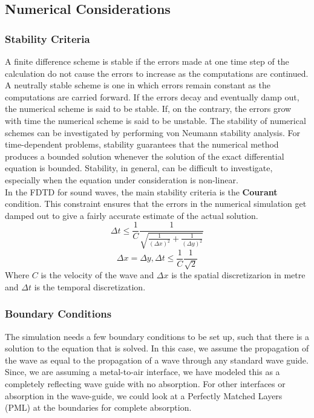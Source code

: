 \subsection{Numerical Considerations}
\subsubsection{Stability Criteria}
A finite difference scheme is stable if the errors made at one time step of the calculation do not cause the errors to increase as the computations are continued. A neutrally stable scheme is one in which errors remain constant as the computations are carried forward. If the errors decay and eventually damp out, the numerical scheme is said to be stable. If, on the contrary, the errors grow with time the numerical scheme is said to be unstable. The stability of numerical schemes can be investigated by performing von Neumann stability analysis. For time-dependent problems, stability guarantees that the numerical method produces a bounded solution whenever the solution of the exact differential equation is bounded. Stability, in general, can be difficult to investigate, especially when the equation under consideration is non-linear. \\
In the FDTD for sound waves, the main stability criteria is the \textbf{Courant} condition. This constraint ensures that the errors in the numerical simulation get damped out to give a fairly accurate  estimate of the actual solution.
\begin{equation}
\Delta t \leq \frac{1}{C} \frac{1}{\sqrt{\frac{1}{(\Delta x)^2}+\frac{1}{(\Delta y)^2}}}
\end{equation}
\begin{equation}
\Delta x = \Delta y,
\Delta t \leq \frac{1}{C} \frac{1}{\sqrt{2}}
\end{equation}
Where $C$ is the velocity of the wave and $\Delta x$ is the spatial discretizarion in metre and $\Delta t$ is the temporal discretization.
\subsubsection{Boundary Conditions}
The simulation needs a few boundary conditions to be set up, such that there is a solution to the equation that is solved. In this case, we assume the propagation of the wave as equal to the propagation of a wave through any standard wave guide. Since, we are assuming a metal-to-air interface, we have modeled this as a completely reflecting wave guide with no absorption. For other interfaces or absorption in the wave-guide, we could look at a Perfectly Matched Layers (PML) at the boundaries for complete absorption.

